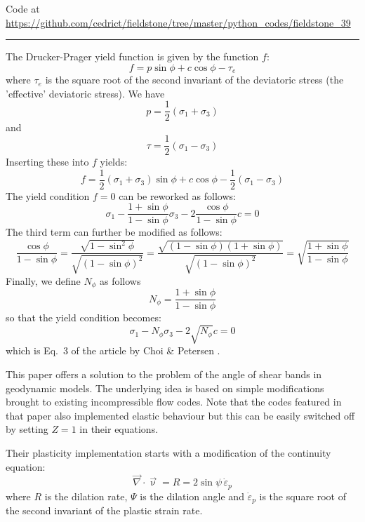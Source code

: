 

\begin{center}
Code at \url{https://github.com/cedrict/fieldstone/tree/master/python_codes/fieldstone_39}
\end{center}

\par\noindent\rule{\textwidth}{0.4pt}

The Drucker-Prager yield function is given by the function $f$:
\[
f = p \sin\phi + c\cos \phi - \tau_e
\]
where $\tau_e$ is the square root of the second invariant of the deviatoric stress
(the 'effective' deviatoric stress).
We have
\[
p=\frac{1}{2}(\sigma_1+\sigma_3) 
\]
and 
\[
\tau = \frac{1}{2}(\sigma_1-\sigma_3)
\]
Inserting these into $f$ yields:
\[
f= \frac{1}{2}(\sigma_1+\sigma_3) \sin\phi + c \cos\phi - \frac{1}{2}(\sigma_1-\sigma_3)
\]
The yield condition $f=0$ can be reworked as follows:
\[
\sigma_1 - \frac{1 + \sin\phi}{1-\sin\phi} \sigma_3 - 2 \frac{\cos \phi}{1-\sin\phi} c = 0
\]
The third term can further be modified as follows:
\[
\frac{\cos \phi}{1-\sin\phi}
=\frac{\sqrt{1-\sin^2 \phi}}{\sqrt{(1-\sin\phi)^2}}
=\frac{\sqrt{(1-\sin \phi)(1+\sin\phi)}}{\sqrt{(1-\sin\phi)^2}}
=\sqrt{
\frac{1+\sin\phi}{1-\sin\phi}
}
\]
Finally, we define $N_\phi$ as follows 
\[
N_\phi=\frac{1+\sin \phi}{1-\sin\phi}
\]
so that the yield condition becomes:
\[
\sigma_1 - N_\phi \sigma_3 - 2 \sqrt{N_\phi} c = 0
\]
which is Eq.~3 of the article by Choi \& Petersen \cite{chpe15}.

\vspace{1cm}

This paper offers a solution to the problem of the angle of shear bands in 
geodynamic models. The underlying idea is based on simple modifications 
brought to existing incompressible flow codes. Note that the codes
featured in that paper also implemented elastic behaviour but this can 
be easily switched off by setting $Z=1$ in their equations.

Their plasticity implementation starts with a modification of the 
continuity equation:
\[
\vec\nabla\cdot\vec\upnu = R = 2 \sin\psi \, \dot{\varepsilon}_p
\]
where $R$ is the dilation rate, $\Psi$ is the dilation angle 
and $\dot{\varepsilon}_p$ is the square root of 
the second invariant of the plastic strain rate.

